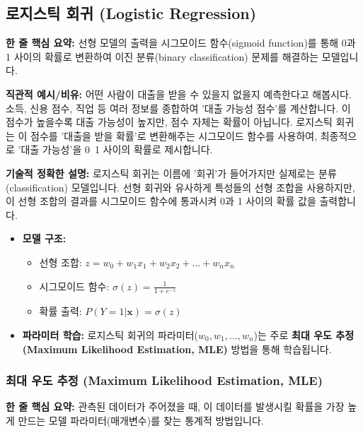 \documentclass[11pt,a4paper]{article}
\theoremstyle{definition}
\begin{document}
\newpage
\subsection{로지스틱 회귀 (Logistic Regression)}

\begin{conceptbox}
\textbf{한 줄 핵심 요약:} 선형 모델의 출력을 시그모이드 함수(sigmoid function)를 통해 0과 1 사이의 확률로 변환하여 이진 분류(binary classification) 문제를 해결하는 모델입니다.
\end{conceptbox}

\textbf{직관적 예시/비유:}
어떤 사람이 대출을 받을 수 있을지 없을지 예측한다고 해봅시다. 소득, 신용 점수, 직업 등 여러 정보를 종합하여 '대출 가능성 점수'를 계산합니다. 이 점수가 높을수록 대출 가능성이 높지만, 점수 자체는 확률이 아닙니다. 로지스틱 회귀는 이 점수를 '대출을 받을 확률'로 변환해주는 시그모이드 함수를 사용하여, 최종적으로 '대출 가능성'을 0~1 사이의 확률로 제시합니다.

\textbf{기술적 정확한 설명:}
로지스틱 회귀는 이름에 '회귀'가 들어가지만 실제로는 분류(classification) 모델입니다. 선형 회귀와 유사하게 특성들의 선형 조합을 사용하지만, 이 선형 조합의 결과를 시그모이드 함수에 통과시켜 0과 1 사이의 확률 값을 출력합니다.

\begin{itemize}
    \item \textbf{모델 구조:}
        \begin{itemize}
            \item 선형 조합: $z = w_0 + w_1x_1 + w_2x_2 + \dots + w_nx_n$
            \item 시그모이드 함수: $\sigma(z) = \frac{1}{1 + e^{-z}}$
            \item 확률 출력: $P(Y=1|\mathbf{x}) = \sigma(z)$
        \end{itemize}
    \item \textbf{파라미터 학습:} 로지스틱 회귀의 파라미터($w_0, w_1, \dots, w_n$)는 주로 \textbf{최대 우도 추정(Maximum Likelihood Estimation, MLE)} 방법을 통해 학습됩니다.
\end{itemize}

\subsubsection*{최대 우도 추정 (Maximum Likelihood Estimation, MLE)}

\begin{conceptbox}
\textbf{한 줄 핵심 요약:} 관측된 데이터가 주어졌을 때, 이 데이터를 발생시킬 확률을 가장 높게 만드는 모델 파라미터(매개변수)를 찾는 통계적 방법입니다.
\end{conceptbox}
\end{document}
